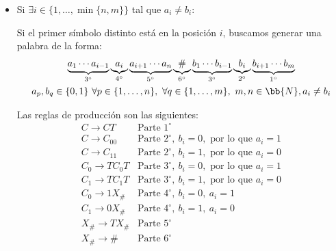 \begin{ejercicio}
\begin{itemize}
        \item Si $\exists i\in \{1,\ldots,\min\{n,m\}\}$ tal que $a_i\neq b_i$:
        
        Si el primer símbolo distinto está en la posición $i$, buscamos generar una palabra de la forma:
        \begin{multline*}
            \underbrace{a_1\cdots a_{i-1}}_{3^\circ}
            \underbrace{a_i}_{4^\circ}
            \underbrace{a_{i+1}\cdots a_n}_{5^\circ}
            \underbrace{\#}_{6^\circ}
            \underbrace{b_1\cdots b_{i-1}}_{3^\circ}
            \underbrace{b_i}_{2^\circ}
            \underbrace{b_{i+1}\cdots b_m}_{1^\circ}
            \\ a_p,b_q\in \{0,1\}~\forall p\in \{1,\ldots,n\},~\forall q\in \{1,\ldots,m\},~m,n\in \bb{N},a_i\neq b_i
        \end{multline*}

        Las reglas de producción son las siguientes:
        \begin{equation*}
            \begin{array}{ll}
                C\to CT         & \text{Parte }1^\circ\\
                C\to C_00       & \text{Parte }2^\circ,~b_i=0,\text{ por lo que }a_i=1\\
                C\to C_11       & \text{Parte }2^\circ,~b_i=1,\text{ por lo que }a_i=0\\
                C_0\to TC_0T    & \text{Parte }3^\circ,~b_i=0,\text{ por lo que }a_i=1\\
                C_1\to TC_1T    & \text{Parte }3^\circ,~b_i=1,\text{ por lo que }a_i=0\\
                C_0\to 1X_{\#}  & \text{Parte }4^\circ,~b_i=0,~a_i=1\\
                C_1\to 0X_{\#}  & \text{Parte }4^\circ,~b_i=1,~a_i=0\\
                X_{\#}\to T X_{\#} & \text{Parte }5^\circ\\
                X_{\#}\to \#    & \text{Parte }6^\circ
            \end{array}
        \end{equation*}        
    \end{itemize}


\end{ejercicio}

